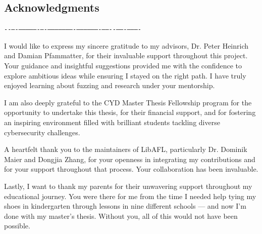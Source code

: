 \documentclass[twocolumn]{article}
\begin{document}
\begin{center}
  \begin{minipage}{0.7\textwidth}
    \vspace{100px}

    \begin{center}
      \section*{Acknowledgments}
      \verb|--–-—–––—-–-———––—–-––———–-–—--—–-—––-|
    \end{center}
    \vspace{3ex}

    \setlength{\parindent}{1.5em}

    I would like to express my sincere gratitude to my advisors, Dr. Peter Heinrich and Damian Pfammatter, for their invaluable support throughout this project. Your guidance and insightful suggestions provided me with the confidence to explore ambitious ideas while ensuring I stayed on the right path. I have truly enjoyed learning about fuzzing and research under your mentorship.

    I am also deeply grateful to the CYD Master Thesis Fellowship program for the opportunity to undertake this thesis, for their financial support, and for fostering an inspiring environment filled with brilliant students tackling diverse cybersecurity challenges.

    A heartfelt thank you to the maintainers of LibAFL, particularly Dr. Dominik Maier and Dongjia Zhang, for your openness in integrating my contributions and for your support throughout that process. Your collaboration has been invaluable.

    Lastly, I want to thank my parents for their unwavering support throughout my educational journey. You were there for me from the time I needed help tying my shoes in kindergarten through lessons in nine different schools — and now I'm done with my master's thesis. Without you, all of this would not have been possible.

  \end{minipage}
\end{center}

\clearpage\newpage
\end{document}
